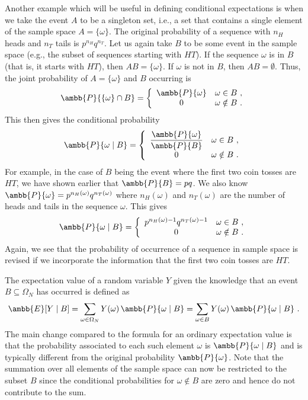 \documentclass[12pt]{article} %
\newcommand{\mE}{\ambb{E}}
\newcommand{\mP}{\ambb{P}}
\begin{document}
Another example which will be useful in defining conditional
expectations is when we take the event $A$ to be a singleton set,
i.e., a set that contains a single element of the sample space
$A=\{\omega\}$. The original probability of a sequence with $n_H$
heads and $n_T$ tails is $p^{n_H}q^{n_T}$. Let us again take $B$ to be
some event in the sample space (e.g., the subset of sequences starting
with $HT$). If the sequence $\omega$ is in $B$ (that is, it starts
with $HT$), then $AB = \{\omega\}$. If $\omega$ is not in $B$, then $AB
= \emptyset$. Thus, the joint probability of $A=\{\omega\}$ and $B$
occurring is
\begin{equation}
  \mP\{\{\omega\}\cap B\} = \left\{\begin{array}{cc} \mP\{\omega\} & \omega \in B\ ,\\ 0 & \omega \notin B\ .\end{array}\right.
\end{equation}
This then gives the conditional probability
\begin{equation}
  \mP\{\omega \mid B\} = \left\{\begin{array}{cc} \dfrac{\mP\{\omega\}}{\mP\{B\}} & \omega \in B\ ,\\[2mm] 0 & \omega \notin B\ . \end{array}\right.
\end{equation}
For example, in the case of $B$ being the event where the first two
coin tosses are $HT$, we have shown earlier that $\mP\{B\} = pq$. We
also know $\mP\{\omega\} = p^{n_H(\omega)}q^{n_T(\omega)}$ where
$n_H(\omega)$ and $n_T(\omega)$ are the number of heads and tails in
the sequence $\omega$. This gives
\begin{equation}
  \mP\{\omega\mid B\} = \left\{\begin{array}{cc} p^{n_H(\omega)-1}q^{n_T(\omega)-1} & \omega \in B\ ,\\ 0 & \omega \notin B\ . \end{array}\right.
\end{equation}
Again, we see that the probability of occurrence of a sequence in
sample space is revised if we incorporate the information that the
first two coin tosses are $HT$.

The expectation value of a random variable $Y$ given the knowledge
that an event $B \subseteq \Omega_N$ has occurred is defined as
\begin{equation}
  \mE[Y\mid B] = \sum_{\omega \in \Omega_N} Y(\omega)\,\mP\{\omega\mid B\} = \sum_{\omega \in B} Y(\omega)\, \mP\{\omega\mid B\}\ .
\end{equation}
The main change compared to the formula for an ordinary expectation
value is that the probability associated to each such element $\omega$
is $\mP\{\omega \mid B\}$ and is typically different from the original
probability $\mP\{\omega\}$. Note that the summation over all elements
of the sample space can now be restricted to the subset $B$ since the
conditional probabilities for $\omega \notin B$ are zero and hence do
not contribute to the sum.
\end{document}
